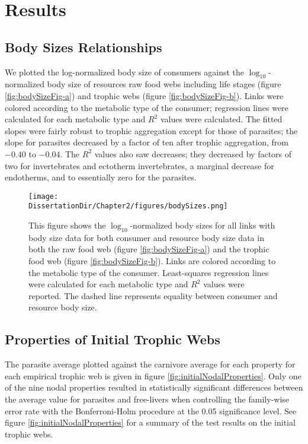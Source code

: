 \documentclass[../dissertation.tex]{subfiles}
\begin{document}
\section{Results} 

\subsection{Body Sizes Relationships} We plotted the log-normalized body size
of consumers against the $\log_{10}$-normalized body size of resources raw food
webs including life stages (figure \ref{fig:bodySizeFig-a}) and trophic webs
(figure \ref{fig:bodySizeFig-b}). Links were colored according to the metabolic
type of the consumer; regression lines were calculated for each metabolic type
and $R^2$ values were calculated. The fitted slopes were fairly robust to
trophic aggregation except for those of parasites; the slope for parasites
decreased by a factor of ten after trophic aggregation, from $-0.40$ to
$-0.04$. The $R^2$ values also saw decreases; they decreased by factors of two
for invertebrates and ectotherm invertebrates, a marginal decrease for
endotherms, and to essentially zero for the parasites.

\begin{figure}
    \centering
    {%
    }%

        \texttt{[image: \\DissertationDir/Chapter2/figures/bodySizes.png]}
        \caption{This figure shows the $\log_{10}$-normalized body sizes for
            all links with body size data for both consumer and resource body
            size data in both the raw food web (figure \ref{fig:bodySizeFig-a})
            and the trophic food web (figure \ref{fig:bodySizeFig-b}). Links
            are colored according to the metabolic type of the consumer.
            Least-squares regression lines were calculated for each metabolic
            type and $R^2$ values were reported. The dashed line represents
            equality between consumer and resource body size.
        \label{fig:bodySizeFig}} 
\end{figure}

\subsection{Properties of Initial Trophic Webs} The parasite average plotted
against the carnivore average for each property for each empirical trophic web
is given in figure \ref{fig:initialNodalProperties}. Only one of the nine nodal
properties resulted in statistically significant differences between the
average value for parasites and free-livers when controlling the family-wise
error rate with the Bonferroni-Holm procedure at the 0.05 significance level.
See figure \ref{fig:initialNodalProperties} for a summary of the test results
on the initial trophic webs.
\end{document}
